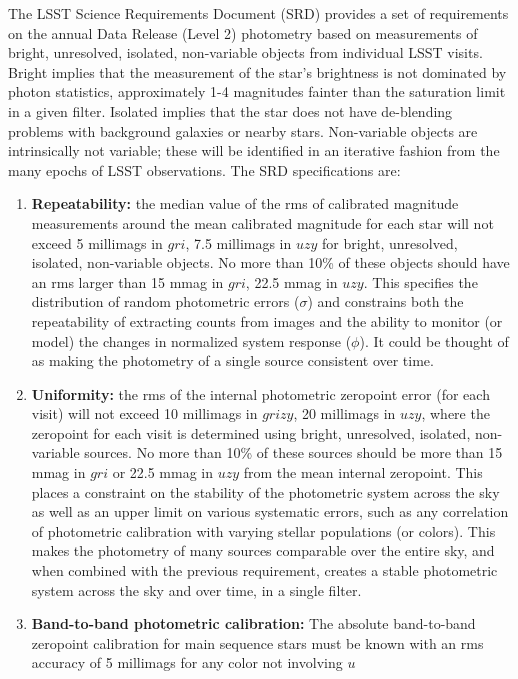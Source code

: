 \documentclass[12pt,preprint]{aastex}
\begin{document}
The LSST Science Requirements Document (SRD) provides a set of
requirements on the annual Data Release (Level 2) photometry based on
measurements of bright, unresolved, isolated, non-variable objects
from individual LSST visits. Bright implies that the
measurement of the star's brightness is not dominated by photon
statistics, approximately 1-4 magnitudes fainter than the saturation
limit in a given filter. Isolated implies that the star does not have
de-blending problems with background galaxies or nearby
stars. Non-variable objects are intrinsically not variable; these will
be identified in an iterative fashion from the many epochs of LSST
observations. The SRD specifications are: 
\begin{enumerate}
\item{{\bf Repeatability:} the median value of the rms of calibrated
magnitude measurements around the mean calibrated magnitude for each
star will not exceed 5 millimags in $gri$, 7.5 millimags in $uzy$ for
bright, unresolved, isolated, non-variable objects. No more
than 10\% of these objects should have an rms larger than 15 mmag in
$gri$, 22.5 mmag in $uzy$.  This specifies the distribution of random
photometric errors ($\sigma$) and constrains both the repeatability of
extracting counts from images and the ability to monitor (or model)
the changes in normalized system response ($\phi$). It could be
thought of as making the photometry of a single source consistent over
time. \label{repeatability_req}}
\item{{\bf Uniformity:} the rms of the internal photometric zeropoint
error (for each visit) will not exceed 10 millimags in $grizy$, 20 millimags in $uzy$,
where the zeropoint for each visit is determined using bright, unresolved, isolated, non-variable
sources. No more than 10\% of these sources should be more than 15
mmag in $gri$ or 22.5 mmag in $uzy$ from the mean internal zeropoint.
This places a constraint on the stability of the photometric system
across the sky as well as an upper limit on various systematic
errors, such as any correlation of photometric calibration with
varying stellar populations (or colors). This makes the photometry of
many sources comparable over the entire sky, and when combined with
the previous requirement, creates a stable photometric system across
the sky and over time, in a single filter. \label{uniformity_req}}
\item{{\bf Band-to-band photometric calibration:} The absolute
band-to-band zeropoint calibration for main sequence stars must be
known with an rms accuracy of 5 millimags for any color not involving $u$
}
\end{enumerate}
\end{document}

